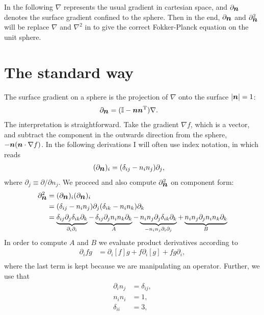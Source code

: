 \documentclass[thesis.tex]{subfiles}
\begin{document}
In the following $\nabla$ represents the usual gradient in cartesian space, and $\partial_{\mbox{\boldmath$n$}}$ denotes the surface gradient confined to the sphere. Then in the end, $\partial_{\mbox{\boldmath$n$}}$ and $\partial^2_{\mbox{\boldmath$n$}}$ will be replace $\nabla$ and $\nabla^2$ in  to give the correct Fokker-Planck equation on the unit sphere.

\section{The standard way}

 The surface gradient on a sphere is the projection of $\nabla$ onto the surface $|\mbox{\boldmath$n$}|=1$:
\begin{align}
	\partial_{\ve n} &= (\ma I - \ve n \ve n \transpose) \nabla.\eqnlab{spherenabla1}
\end{align}
The interpretation is straightforward. Take the gradient $\nabla f$, which is a vector, and subtract the component in the outwards direction from the sphere, $-\mbox{\boldmath$n$}(\mbox{\boldmath$n$} \cdot \nabla f)$. In the following derivations I will often use index notation, in which  reads
\begin{align*}
	(\partial_{\mbox{\boldmath$n$}})_i &= (\delta_{ij} - n_in_j)\partial_j,
\end{align*}
where $\partial_j \equiv \partial/\partial n_j$. We proceed and also compute $\partial^2_{\mbox{\boldmath$n$}}$ on component form:
\begin{align}
	\partial^2_{\ve n} &= (\partial_{\ve n})_i(\partial_{\ve n})_i \nn \\
	&= (\delta_{ij} - n_in_j)\partial_j(\delta_{ik} - n_in_k)\partial_k \nn \\
	&= \underbrace{\delta_{ij}\partial_j \delta_{ik} \partial_k}_{\partial_i\partial_i} - \underbrace{\delta_{ij}\partial_jn_in_k\partial_k}_{A} - \underbrace{n_in_j\partial_j\delta_{ik}\partial_k}_{-n_in_j\partial_i\partial_j} + \underbrace{n_in_j\partial_jn_in_k\partial_k}_{B}\eqnlab{partialn2start}
\end{align}
In order to compute $A$ and $B$ we evaluate product derivatives according to
\begin{align*}
	\partial_i f g &= \partial_i [f] g + f \partial_i[g] + fg \partial_i, \\
\end{align*}
where the last term is kept because we are manipulating an operator. Further, we use that
\begin{align*}
		\partial_i n_j &= \delta_{ij},\\
		n_in_i &= 1,\\
		\delta_{ii} &= 3,
\end{align*}
\end{document}
